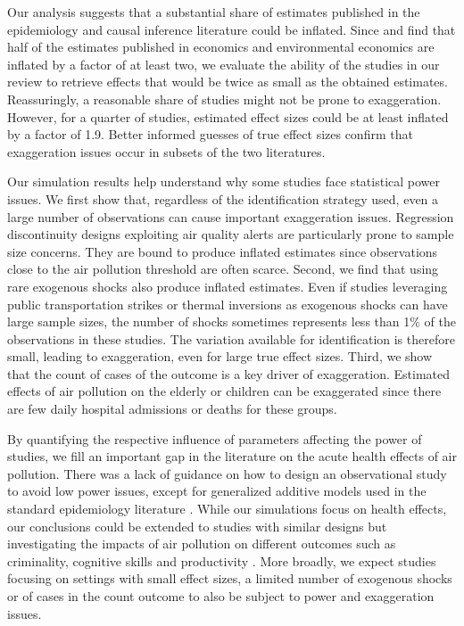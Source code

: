 \documentclass[12pt]{article}
\begin{document}
    Our analysis suggests that a substantial share of estimates published in the epidemiology and causal inference literature could be inflated. Since \cite{ioannidis_power_2017} and \cite{ferraro_featureis_2020} find that half of the estimates published in economics and environmental economics are inflated by a factor of at least two, we evaluate the ability of the studies in our review to retrieve effects that would be twice as small as the obtained estimates. Reassuringly, a reasonable share of studies might not be prone to exaggeration. However, for a quarter of studies, estimated effect sizes could be at least inflated by a factor of 1.9. Better informed guesses of true effect sizes confirm that exaggeration issues occur in subsets of the two literatures.

    Our simulation results help understand why some studies face statistical power issues. We first show that, regardless of the identification strategy used, even a large number of observations can cause important exaggeration issues. Regression discontinuity designs exploiting air quality alerts are particularly prone to sample size concerns. They are bound to produce inflated estimates since observations close to the air pollution threshold are often scarce. Second, we find that using rare exogenous shocks also produce inflated estimates. Even if studies leveraging public transportation strikes or thermal inversions as exogenous shocks can have large sample sizes, the number of shocks sometimes represents less than 1\% of the observations in these studies. The variation available for identification is therefore small, leading to exaggeration, even for large true effect sizes. Third, we show that the count of cases of the outcome is a key driver of exaggeration. Estimated effects of air pollution on the elderly or children can be exaggerated since there are few daily hospital admissions or deaths for these groups. 
    
    By quantifying the respective influence of parameters affecting the power of studies, we fill an important gap in the literature on the acute health effects of air pollution. There was a lack of guidance on how to design an observational study to avoid low power issues, except for generalized additive models used in the standard epidemiology literature \citep{winquist2012power}. While our simulations focus on health effects, our conclusions could be extended to studies with similar designs but investigating the impacts of air pollution on different outcomes such as criminality, cognitive skills and productivity \citep{herrnstadt_air_2021, ebenstein_long-run_2016, adhvaryu2022management}. More broadly, we expect studies focusing on settings with small effect sizes, a limited number of exogenous shocks or of cases in the count outcome to also be subject to power and exaggeration issues. 
    
\end{document}
